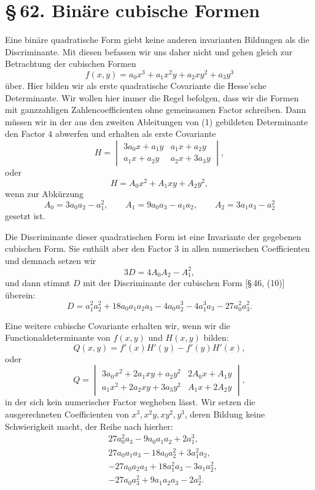 \documentclass[11pt]{article}
\providecommand{\sect}[2]{\section*{\S\,#1. #2}}
\begin{document}
\clearpage

\sect{62}{Binäre cubische Formen}

Eine binäre quadratische Form giebt keine anderen invarianten Bildungen als die Discriminante. Mit diesen befassen wir uns daher nicht und gehen gleich zur Betrachtung der cubischen Formen
\begin{equation}
 f(x,y)=a_0x^3+a_1x^2y+a_2xy^2+a_3y^3
\tag{1}
\end{equation}
über. Hier bilden wir als erste quadratische Covariante die Hesse'sche Determinante. Wir wollen hier immer die Regel befolgen, dass wir die Formen mit ganzzahligen Zahlencoefficienten ohne gemeinsamen Factor schreiben. Dann müssen wir in der aus den zweiten Ableitungen von (1) gebildeten Determinante den Factor $4$ abwerfen und erhalten als erste Covariante
\[
 H=\begin{vmatrix}
 3a_0x+a_1y & a_1x+a_2y\\
 a_1x+a_2y & a_2x+3a_3y
 \end{vmatrix},
\]
oder
\begin{equation}
 H=A_0x^2+A_1xy+A_2y^2,
\tag{2}
\end{equation}
wenn zur Abkürzung
\begin{equation}
 A_0=3a_0a_2-a_1^2,
 \qquad
 A_1=9a_0a_3-a_1a_2,
 \qquad
 A_2=3a_1a_3-a_2^2
\tag{3}
\end{equation}
gesetzt ist.

Die Discriminante dieser quadratischen Form ist eine Invariante der gegebenen cubischen Form. Sie enthält aber den Factor $3$ in allen numerischen Coefficienten und demnach setzen wir
\begin{equation}
 3D=4A_0A_2-A_1^2,
\tag{4}
\end{equation}
und dann stimmt $D$ mit der Discriminante der cubischen Form [\S\,46, (10)] überein:
\begin{equation}
 D=a_1^2a_2^2+18a_0a_1a_2a_3-4a_0a_2^3-4a_1^3a_3-27a_0^2a_3^2.
\tag{5}
\end{equation}

Eine weitere cubische Covariante erhalten wir, wenn wir die Functionaldeterminante von $f(x,y)$ und $H(x,y)$ bilden:
\begin{equation}
 Q(x,y)=f'(x)H'(y)-f'(y)H'(x),
\tag{6}
\end{equation}
oder
\begin{equation}
 Q=\begin{vmatrix}
 3a_0x^2+2a_1xy+a_2y^2 & 2A_0x+A_1y\\
 a_1x^2+2a_2xy+3a_3y^2 & A_1x+2A_2y
 \end{vmatrix},
\tag{7}
\end{equation}
in der sich kein numerischer Factor wegheben lässt. Wir setzen die ausgerechneten Coefficienten von $x^3,x^2y,xy^2,y^3$, deren Bildung keine Schwierigkeit macht, der Reihe nach hierher:
\[
\begin{aligned}
&27a_0^2a_3-9a_0a_1a_2+2a_1^3,\\
&27a_0a_1a_3-18a_0a_2^2+3a_1^2a_2,\\
&-27a_0a_2a_3+18a_1^2a_3-3a_1a_2^2,\\
&-27a_0a_3^2+9a_1a_2a_3-2a_2^3.
\end{aligned}
\]
\end{document}
